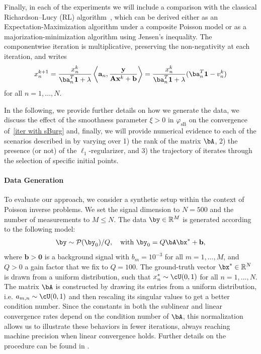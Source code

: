 \documentclass[11pt]{amsart}
\begin{document}
Finally, in each of the experiments we will include a comparison with the classical Richardson--Lucy (RL) algorithm~\cite{FI2011,lucy74,richardson1972bayesian}, which can be derived either as an Expectation-Maximization algorithm under a composite Poisson model or as a majorization-minimization algorithm using Jensen's inequality. The componentwise iteration is multiplicative, preserving the non-negativity at each iteration, and writes
\begin{equation}\label{eq:Rich_Lucy}
x_n^{k+1} =  \frac{x_n^k}{\ba_n^T \mathbf{1} + \lambda}\left\langle \mathbf{a}_n, \frac{\mathbf{y}}{\mathbf{A}\mathbf{x}^k + \mathbf{b}} \right\rangle  = \frac{x_n^k}{\ba_n^T \mathbf{1} + \lambda} (\ba_n^T \mathbf{1} - v_n^k)
\end{equation}
for all $n=1,\ldots, N$.

In the following, we provide further details on how we generate the data, we discuss the effect of the smoothness parameter $\xi>0$ in $\varphi_{\mathrm{sB}}$ on the convergence of~\cref{iter with sBurg} and, finally, we will provide numerical evidence to each of the scenarios described in  by varying over 1) the rank of the matrix $\bA$, 2) the presence (or not) of the $\ell_1$-regularizer, and 3) the trajectory of iterates through the selection of specific initial points. \\

\paragraph{\textbf{Data Generation}} \label{sec: data gen}
To evaluate our approach, we consider a synthetic setup within the context of Poisson inverse problems. We set the signal dimension to $N=500$ and the number of measurements to $M \leq N$. The data $\by \in \mathbb{R}^M$ is generated according to the following model:
\begin{equation}\label{eq:PoissModel numerics}
    \by \sim \mathcal{P}(\by_0)/Q, \quad \text{with } \by_0 = Q\bA \bx^* + \mathbf{b}, 
\end{equation}
where $\mathbf{b} > \boldsymbol{0}$ is a background signal with $b_m = 10^{-3}$ for all $m=1,\ldots,M$, and $Q>0$ a gain factor that we fix to $Q=100$.  The ground-truth vector $\bx^* \in \mathbb{R}^N$ is drawn from a uniform distribution, such that $x_n^* \sim \cU(0, 1)$ for all $n=1,\ldots,N$. The matrix $\bA$ is constructed by drawing its entries from a uniform distribution, i.e.  $a_{m,n} \sim \cU(0, 1)$ and then rescaling its singular values to get a better condition number. Since the constants in both the sublinear and linear convergence rates depend on the condition number of $\bA$, this normalization allows us to illustrate these behaviors in fewer iterations, always reaching machine precision when linear convergence holds. Further details on the procedure can be found in .
\end{document}

